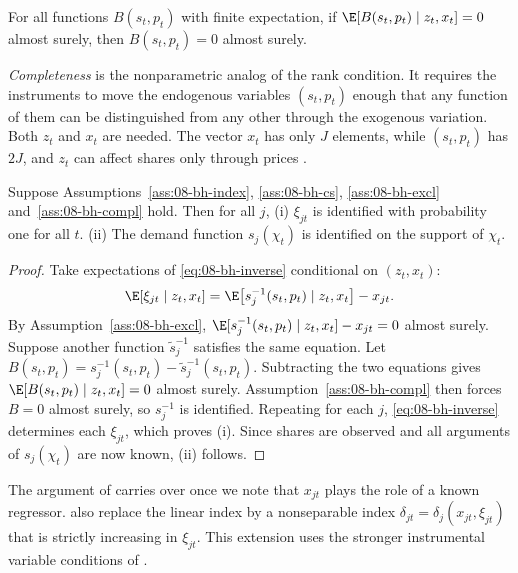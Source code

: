 \begin{assumption}\label{ass:08-bh-compl}
For all functions $B(s_t, p_t)$ with finite expectation, if $\E[B(s_t, p_t) \mid z_t, x_t] = 0$ almost surely,
then $B(s_t, p_t) = 0$ almost surely.
\end{assumption}

\emph{Completeness} is the nonparametric analog of the rank condition. It requires the instruments to move the
endogenous variables $(s_t, p_t)$ enough that any function of them can be distinguished from any other through
the exogenous variation. Both $z_t$ and $x_t$ are needed. The vector $x_t$ has only $J$ elements, while $(s_t,
p_t)$ has $2J$, and $z_t$ can affect shares only through prices \citep[p.~1762]{BerryHaile2014}.

\begin{theorem}\label{thm:08-bh-demand}
Suppose Assumptions~\ref{ass:08-bh-index}, \ref{ass:08-bh-cs}, \ref{ass:08-bh-excl} and~\ref{ass:08-bh-compl}
hold. Then for all $j$, (i) $\xi_{jt}$ is identified with probability one for all $t$. (ii) The demand function
$s_j(\chi_t)$ is identified on the support of $\chi_t$.
\end{theorem}

\begin{proof}
Take expectations of \eqref{eq:08-bh-inverse} conditional on $(z_t, x_t)$:
\begin{equation*}
  \E[\xi_{jt} \mid z_t, x_t] = \E\big[s_j^{-1}(s_t, p_t) \mid z_t, x_t\big] - x_{jt}.
\end{equation*}
By Assumption~\ref{ass:08-bh-excl}, $\E[s_j^{-1}(s_t, p_t) \mid z_t, x_t] - x_{jt} = 0$ almost surely. Suppose another
function $\tilde s_j^{-1}$ satisfies the same equation. Let $B(s_t, p_t) = s_j^{-1}(s_t, p_t) - \tilde
s_j^{-1}(s_t, p_t)$. Subtracting the two equations gives $\E[B(s_t, p_t) \mid z_t, x_t] = 0$ almost surely.
Assumption~\ref{ass:08-bh-compl} then forces $B = 0$ almost surely, so $s_j^{-1}$ is identified. Repeating for each $j$,
\eqref{eq:08-bh-inverse} determines each $\xi_{jt}$, which proves (i). Since shares are observed and all
arguments of $s_j(\chi_t)$ are now known, (ii) follows.
\end{proof}

The argument of \citet{NeweyPowell2003} carries over once we note that $x_{jt}$ plays the role of a known
regressor. \citet[Appendix B]{BerryHaile2014} also replace the linear index by a nonseparable index
$\delta_{jt} = \delta_j(x_{jt}, \xi_{jt})$ that is strictly increasing in $\xi_{jt}$. This extension uses the
stronger instrumental variable conditions of \citet{ChernozhukovHansen2005}.

